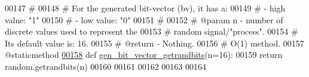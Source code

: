 \begin{DoxyCode}
00147     \textcolor{comment}{#}
00148     \textcolor{comment}{#   For the generated bit-vector (bv), it has a:}
00149     \textcolor{comment}{#   - high value: "1"}
00150     \textcolor{comment}{#   - low value: "0"}
00151     \textcolor{comment}{#}
00152     \textcolor{comment}{#   @param n - number of discrete values used to represent the}
00153     \textcolor{comment}{#               random signal/"process".}
00154     \textcolor{comment}{#               Its default value is: 16.}
00155     \textcolor{comment}{#   @return - Nothing.}
00156     \textcolor{comment}{#   O(1) method.}
00157     @staticmethod
\hypertarget{random__process__generator_8py_source_l00158}{}\hyperlink{classrandom__process__models_1_1random__process__generator_1_1rand__signal__generator_a281d575afed0d10531c7cfaf17df2f5a}{00158}     \textcolor{keyword}{def }\hyperlink{classrandom__process__models_1_1random__process__generator_1_1rand__signal__generator_a281d575afed0d10531c7cfaf17df2f5a}{gen\_bit\_vector\_getrandbits}(n=16):
00159         \textcolor{keywordflow}{return} random.getrandbits(n)
00160 
00161 
00162 
00163 
00164 
\end{DoxyCode}
